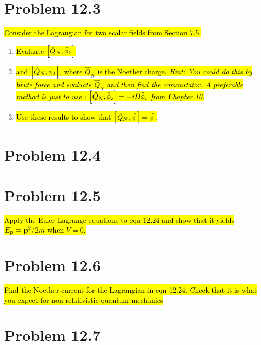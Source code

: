 \documentclass{article}
\begin{document}
\section*{Problem 12.3}
\begin{quoting}
    \hl{Consider the Lagrangian for two scalar fields from Section 7.5.}
    \begin{enumerate}[label=(\alph*)]
        \item \hl{Evaluate $\bqty{\hat{Q}_N,\hat{\phi}_1}$}
        \item \hl{and $\bqty{\hat{Q}_N,\hat{\phi}_2}$, where $\hat{Q}_N$ is the Noether charge. \emph{Hint: You could do this by brute force and evaluate $\hat{Q}_N$ and then find the commutator. A preferable method is just to use : $\bqty{\hat{Q}_N,\hat{\phi}_i}=-iD\hat{\phi}_i$ from Chapter 10.}}
        \item \hl{Use these results to show that $\bqty{\hat{Q}_N,\hat{\psi}}=\hat{\psi}$.}
    \end{enumerate}
\end{quoting}


\section*{Problem 12.4}


\section*{Problem 12.5}
\begin{quoting}
    \hl{Apply the Euler-Lagrange equations to eqn 12.24 and show that it yields $E_{\vb{p}}=\vb{p}^2 /2m$ when $V=0$.}
\end{quoting}


\section*{Problem 12.6}
\begin{quoting}
    \hl{Find the Noether current for the Lagrangian in eqn 12.24. Check that it is what you expect for non-relativistic quantum mechanics}
\end{quoting}


\section*{Problem 12.7}
\end{document}
